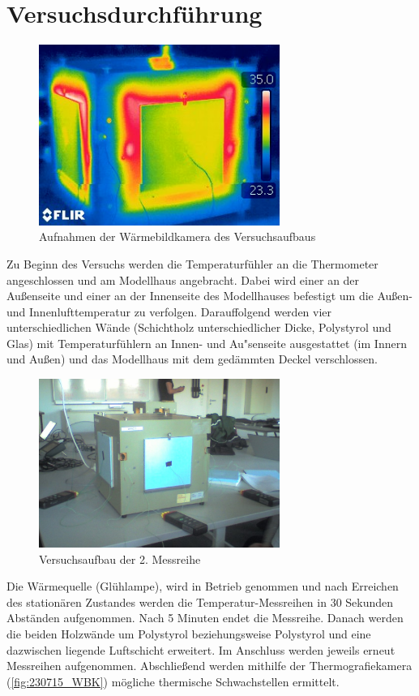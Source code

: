 \section{Versuchsdurchführung}

\begin{figure}[H]
    \centering
    \includegraphics[width=0.7\textwidth]{Abbildungen/WBK_UWERT.jpg}
    \caption{Aufnahmen der Wärmebildkamera des Versuchsaufbaus}
    \label{fig:230715_WBK}
\end{figure}

Zu Beginn des Versuchs werden die Temperaturfühler an die Thermometer angeschlossen und am Modellhaus angebracht. Dabei wird einer an der Außenseite und einer an der Innenseite des Modellhauses befestigt 
um die Außen- und Innenlufttemperatur zu verfolgen. Darauffolgend werden vier unterschiedlichen Wände (Schichtholz unterschiedlicher Dicke, Polystyrol und Glas) mit Temperaturfühlern an Innen- und Au"senseite ausgestattet (im Innern und Außen) und 
das Modellhaus mit dem gedämmten Deckel verschlossen.

\begin{figure}[H]
    \centering
    \includegraphics[width=0.7\textwidth]{Abbildungen/M2_Modellhaus.jpeg}
    \caption{Versuchsaufbau der 2. Messreihe}
    \label{fig:230715_M2}
\end{figure}

Die Wärmequelle (Glühlampe), wird in Betrieb genommen und nach Erreichen des stationären Zustandes werden die Temperatur-Messreihen in 30 Sekunden Abständen aufgenommen. Nach 5 Minuten endet die Messreihe.
 Danach werden die beiden Holzwände um Polystyrol beziehungsweise Polystyrol und eine dazwischen liegende Luftschicht erweitert. Im Anschluss werden jeweils erneut Messreihen aufgenommen. 
Abschließend werden mithilfe der Thermografiekamera (\autoref{fig:230715_WBK}) mögliche thermische Schwachstellen ermittelt.